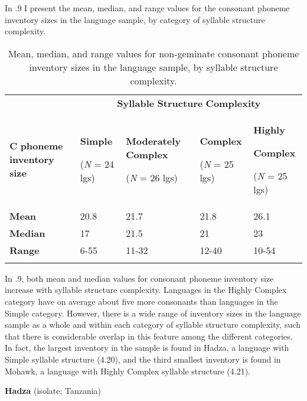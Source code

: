   In .9 I present the mean, median, and range values for the consonant phoneme inventory sizes in the language sample, by category of syllable structure complexity. 






\begin{table}
\begin{tabularx}{\textwidth}{XXXXX}
 & \multicolumn{4}{c}{ \textbf{Syllable} \textbf{Structure} \textbf{Complexity}}\\
\lsptoprule
\textbf{C} \textbf{phoneme} \textbf{inventory} \textbf{size} & { \textbf{Simple}}

 (\textit{N} = 24 lgs) & { \textbf{Moderately} \textbf{Complex}}

 (\textit{N} = 26 lgs) & { \textbf{Complex}}

 (\textit{N} = 25 lgs) & { \textbf{Highly} }

{ \textbf{Complex}}

 (\textit{N} = 25 lgs)\\
\textbf{Mean} & 20.8 & 21.7 & 21.8 & 26.1\\
\textbf{Median} & 17 & 21.5 & 21 & 23\\
\textbf{Range} & 6-55 & 11-32 & 12-40 & 10-54\\
\lspbottomrule
\end{tabularx}
\caption{\label{4.9}Mean, median, and range values for non-geminate consonant phoneme inventory sizes in the language sample, by syllable structure complexity.}
\end{table}




  In .9, both mean and median values for consonant phoneme inventory size increase with syllable structure complexity. Languages in the Highly Complex category have on average about five more consonants than languages in the Simple category. However, there is a wide range of inventory sizes in the language sample as a whole and within each category of syllable structure complexity, such that there is considerable overlap in this feature among the different categories. In fact, the largest inventory in the sample is found in Hadza, a language with Simple syllable structure (4.20), and the third smallest inventory is found in Mohawk, a language with Highly Complex syllable structure (4.21).



\ea\label{ex:(4.20)}
   \textbf{Hadza} (isolate; Tanzania)



